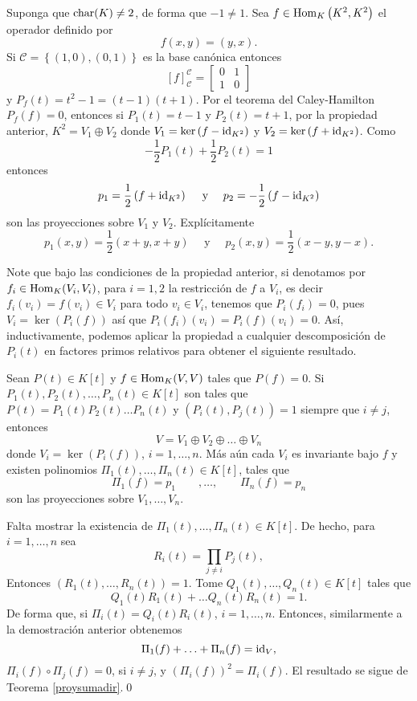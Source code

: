 \begin{ejem}
Suponga que $\operatorname{char}(K)\ne 2$, de forma que $-1\ne 1$. Sea $f\in\operatorname{Hom}_K\left(K^2,K^2\right)$ el operador definido por
$$f(x,y)=(y,x).$$
Si $\mathcal{C}=\left\{(1,0),(0,1)\right\}$ es la base can\'onica entonces
$$\left[ f\right]^{\mathcal{C}}_{\mathcal{C}}=
\left[\begin{array}{rr}
0 & 1\\ 1 & 0
\end{array}\right]
$$
y $P_f(t)=t^2-1=(t-1)(t+1)$. Por el teorema del Caley-Hamilton $P_f(f)=0$, entonces si $P_1(t)=t-1$ y $P_2(t)=t+1$, por la propiedad anterior, $K^2=V_1\oplus V_2$ donde $V_1=\ker\left(f-\operatorname{id}_{K^2}\right)$ y $V_2=\ker\left(f+\operatorname{id}_{K^2}\right)$. Como
$$-\frac{1}{2}P_1(t)+\frac{1}{2}P_2(t)=1$$
entonces
$$p_1=\frac{1}{2}\left(f+\operatorname{id}_{K^2}\right)\quad\textrm{ y }\quad p_2=-\frac{1}{2}\left(f-\operatorname{id}_{K^2}\right)$$
son las proyecciones sobre $V_1$ y $V_2$. Expl\'icitamente
$$p_1(x,y)=\frac{1}{2}(x+y,x+y)\quad\textrm{ y }\quad p_2(x,y)=\frac{1}{2}(x-y,y-x).$$
\end{ejem}

\begin{obs}
Note que bajo las condiciones de la propiedad anterior, si denotamos por $f_i\in\operatorname{Hom}_K(V_i,V_i)$, para $i=1,2$ la restricci\'on de $f$ a $V_i$, es decir $f_i(v_i)=f(v_i)\in V_i$ para todo $v_i\in V_i$, tenemos que $P_i(f_i)=0$, pues $V_i=\ker\left(P_i(f)\right)$ as\'i que $P_i(f_i)(v_i)=P_i(f)(v_i)=0$. As\'i, inductivamente, podemos aplicar la propiedad a cualquier descomposici\'on de $P_i(t)$ en factores primos relativos para obtener el siguiente resultado. 
\end{obs}

\begin{pro}\label{prodescomp}
Sean $P(t)\in K[t]$ y $f\in\operatorname{Hom}_K(V,V)$ tales que $P(f)=0$. Si $P_1(t),P_2(t),\ldots,P_n(t)\in K[t]$ son tales que $P(t)=P_1(t)P_2(t)\ldots P_n(t)$ y $\left(P_i(t),P_j(t)\right)=1$ siempre que $i\ne j$, entonces
\[
V=V_1\oplus V_2\oplus\ldots\oplus V_n
\] 
donde $V_i=\ker\left(P_i(f)\right)$, $i=1,\ldots,n$. M\'as a\'un cada $V_i$ es invariante bajo $f$ y existen polinomios $\Pi_1(t),\ldots,\Pi_n(t)\in K[t]$, tales que
\[
\Pi_1(f)=p_1\qquad,\ldots,\qquad\Pi_n(f)=p_n
\]
son las proyecciones sobre $V_1,\ldots,V_n$.
\end{pro}

\dem Falta mostrar la existencia de $\Pi_1(t),\ldots,\Pi_n(t)\in K[t]$. De hecho, para $i=1,\ldots,n$ sea
\[
R_i(t)=\prod_{j\ne i}P_j(t), 
\]
Entonces $(R_1(t),\ldots,R_n(t))=1$. Tome $Q_1(t),\ldots, Q_n(t)\in K[t]$ tales que
\[
Q_1(t)R_1(t)+\ldots Q_n(t)R_n(t)=1.
\]
De forma que, si $\Pi_i(t)=Q_i(t)R_i(t)$, $i=1,\ldots,n$. Entonces, similarmente a la demostraci\'on anterior obtenemos
\[
\Pi_1(f)+\ldots+\Pi_n(f)=\operatorname{id}_V,
\]
$\Pi_i(f)\circ\Pi_j(f)=0$, si $i\ne j$, y $\left(\Pi_i(f)\right)^2=\Pi_i(f)$. El resultado se sigue de Teorema \ref{proysumadir}.\qed

